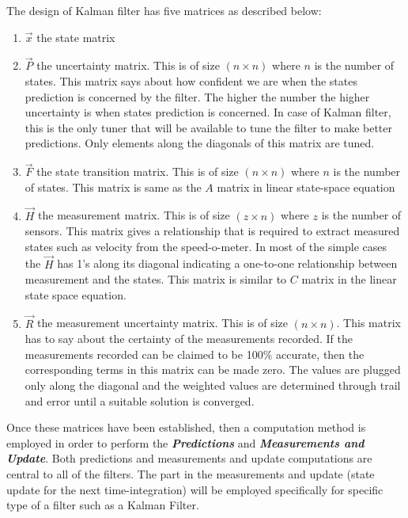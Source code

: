 The design of Kalman filter has five matrices as described below:
\begin{enumerate}
	\item $\vec{x}$ the state matrix
	\item $\vec{P}$ the uncertainty matrix. This is of size $(n \times n)$ where $n$ is the number of states. This matrix says about how confident we are when the states prediction is concerned by the filter. The higher the number the higher uncertainty is when states prediction is concerned. In case of Kalman filter, this is the only tuner that will be available to tune the filter to make better predictions. Only elements along the diagonals of this matrix are tuned.
	\item $\vec{F}$ the state transition matrix. This is of size $(n \times n)$ where $n$ is the number of states. This matrix is same as the $A$ matrix in linear state-space equation 
	\item $\vec{H}$ the measurement matrix. This is of size $(z \times n)$ where $z$ is the number of sensors. This matrix gives a relationship that is required to extract measured states such as velocity from the speed-o-meter. In most of the simple cases the  $\vec{H}$ has 1's along its diagonal indicating a one-to-one relationship between measurement and the states. This matrix is similar to $C$ matrix in the linear state space equation.
	\item $\vec{R}$ the measurement uncertainty matrix. This is of size $(n \times n)$. This matrix has to say about the certainty of the measurements recorded. If the measurements recorded can be claimed to be 100$\%$ accurate, then the corresponding terms in this matrix can be made zero. The values are plugged only along the diagonal and the weighted values are determined through trail and error until a suitable solution is converged.  
\end{enumerate}

Once these matrices have been established, then a computation method is employed in order to perform the \textbf{\textit{Predictions}} and \textbf{\textit{Measurements and Update}}. Both predictions and measurements and update computations are central to all of the filters. The part in the measurements and update (state update for the next time-integration) will be employed specifically for specific type of a filter such as a Kalman Filter. 

